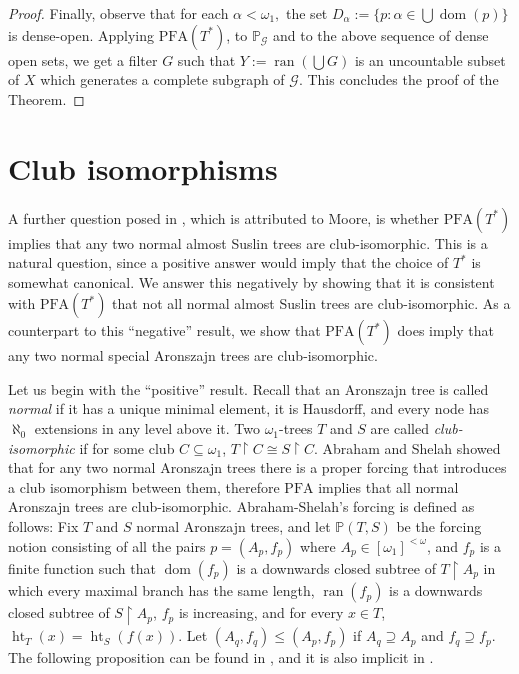 \documentclass{amsart}
\theoremstyle{definition}
\newcommand{\al}{\omega_1}
\renewcommand{\P}{\mathbb{P}}
\newcommand{\seb}{\subseteq}
\newcommand{\res}{\restriction}
\newcommand{\PFA}{\mathrm{PFA}}
\DeclareMathOperator{\dom}{dom}
\DeclareMathOperator{\ran}{ran}
\DeclareMathOperator{\hht}{ht}
\begin{document}
\begin{proof}
Finally, observe that for each $\alpha<\al,$ the set $D_\alpha:=\{p: \alpha\in \bigcup \dom(p)\} $ is dense-open. Applying $\PFA(T^*)$, to $\P_\mathcal{G}$ and to the above sequence of dense open sets, we get a filter $G$ such that $Y:=\ran(\bigcup G)$ is an uncountable subset of $X$ which generates a complete subgraph of $\mathcal{G}.$ This concludes the proof of the Theorem.
\end{proof}




\section{Club isomorphisms}\label{sec:club-iso}

A further question posed in \cite{Krueger2020}, which is
attributed to Moore, is whether $\PFA(T^{*})$ implies that any two
normal almost Suslin trees are club-isomorphic. This is a natural
question, since a positive answer  would imply that the choice of $T^{*}$ is somewhat
canonical. We answer this negatively by showing that it is consistent with
$\PFA(T^{*})$ that not all normal almost Suslin trees are club-isomorphic.
As a counterpart to this ``negative'' result, we show that
$\PFA(T^{*})$ does imply that any two normal special Aronszajn trees are
club-isomorphic.

Let us begin with the ``positive'' result. Recall that an Aronszajn tree is called \emph{normal} if it has a
unique minimal element, it is Hausdorff, and every node has
$\aleph_{0}$ extensions in any level above it. Two $\omega_{1}$-trees
$T$ and $S$ are called \emph{club-isomorphic} if for some club $C \seb
\omega_{1}$, $T \res C \cong S \res C$. Abraham and Shelah
\cite{ShelahAbraham} showed that for any two normal Aronszajn trees
there is a proper forcing that introduces a club isomorphism between
them, therefore $\PFA$ implies that all normal Aronszajn trees are
club-isomorphic. Abraham-Shelah's forcing
is defined as follows:
Fix $T$ and $S$ normal Aronszajn trees, and let $\P(T,S)$  be the
forcing notion consisting of all the pairs $p = (A_{p},f_p)$ where $A_{p} \in
[\omega_{1}]^{<\omega}$, and $f_{p}$ is a finite function such that
$\dom(f_{p})$ is a downwards closed subtree of $T \res A_{p}$
in which every maximal branch has the same length,
$\ran(f_{p})$ is a downwards closed subtree of $S \res A_{p}$,
$f_{p}$ is increasing, and for every $x \in T$, $\hht_{T}(x) = \hht_{S}(f(x))$.
Let $(A_{q},f_{q}) \le (A_{p},f_{p})$ if $A_{q} \supseteq A_{p}$ and
$f_{q} \supseteq f_{p}$. The following
proposition can be found in \cite{Krueger2025}, and it is also implicit
in \cite{ShelahAbraham}.
\end{document}
